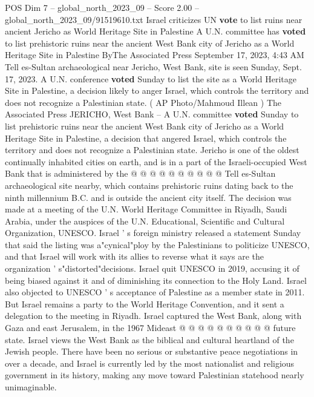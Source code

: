 \begin{textsample}{POS Dim 7 – global\_north\_2023\_09 – Score 2.00 – global\_north\_2023\_09/91519610.txt}  \label{ex:f7_pos_369}
Israel criticizes UN \textbf{vote} to list ruins near ancient Jericho as World Heritage Site in Palestine A U.N. committee has \textbf{voted} to list prehistoric ruins near the ancient West Bank city of Jericho as a World Heritage Site in Palestine ByThe Associated Press September 17, 2023, 4:43 AM Tell es-Sultan archaeological near Jericho, West Bank, site is seen Sunday, Sept. 17, 2023.
A U.N. conference \textbf{voted} Sunday to list the site as a World Heritage Site in Palestine, a decision likely to anger Israel, which controls the territory and does not recognize a Palestinian state. ( AP Photo/Mahmoud Illean ) The Associated Press JERICHO, West Bank -- A U.N. committee \textbf{voted} Sunday to list prehistoric ruins near the ancient West Bank city of Jericho as a World Heritage Site in Palestine, a decision that angered Israel, which controls the territory and does not recognize a Palestinian state.
Jericho is one of the oldest continually inhabited cities on earth, and is in a part of the Israeli-occupied West Bank that is administered by the @ @ @ @ @ @ @ @ @ @ Tell es-Sultan archaeological site nearby, which contains prehistoric ruins dating back to the ninth millennium B.C. and is outside the ancient city itself.
The decision was made at a meeting of the U.N.
World Heritage Committee in Riyadh, Saudi Arabia, under the auspices of the U.N.
Educational, Scientific and Cultural Organization, UNESCO.
Israel ' s foreign ministry released a statement Sunday that said the listing was a"cynical"ploy by the Palestinians to politicize UNESCO, and that Israel will work with its allies to reverse what it says are the organization ' s"distorted"decisions.
Israel quit UNESCO in 2019, accusing it of being biased against it and of diminishing its connection to the Holy Land.
Israel also objected to UNESCO ' s acceptance of Palestine as a member state in 2011.
But Israel remains a party to the World Heritage Convention, and it sent a delegation to the meeting in Riyadh.
Israel captured the West Bank, along with Gaza and east Jerusalem, in the 1967 Mideast @ @ @ @ @ @ @ @ @ @ future state.
Israel views the West Bank as the biblical and cultural heartland of the Jewish people.
There have been no serious or substantive peace negotiations in over a decade, and Israel is currently led by the most nationalist and religious government in its history, making any move toward Palestinian statehood nearly unimaginable.

\end{textsample}

